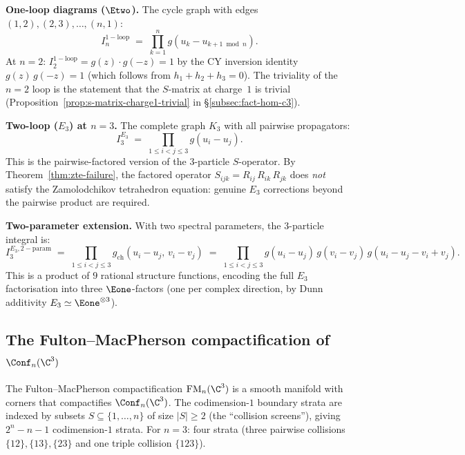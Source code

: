 \medskip\noindent\textbf{One-loop diagrams ($\Etwo$).} The cycle graph with edges $(1,2), (2,3), \ldots, (n,1)$:
\begin{equation}\label{eq:loop-integral}
 I_n^{\mathrm{1-loop}} \;=\; \prod_{k=1}^{n} g(u_k - u_{k+1 \bmod n}).
\end{equation}
At $n = 2$: $I_2^{\mathrm{1-loop}} = g(z) \cdot g(-z) = 1$ by the CY inversion identity $g(z)\, g(-z) = 1$ (which follows from $h_1 + h_2 + h_3 = 0$). The triviality of the $n = 2$ loop is the statement that the $S$-matrix at charge~$1$ is trivial (Proposition~\ref{prop:s-matrix-charge1-trivial} in \S\ref{subsec:fact-hom-c3}).

\medskip\noindent\textbf{Two-loop ($E_3$) at $n = 3$.} The complete graph $K_3$ with all pairwise propagators:
\begin{equation}\label{eq:two-loop-integral}
 I_3^{E_3} \;=\; \prod_{1 \leq i < j \leq 3} g(u_i - u_j).
\end{equation}
This is the pairwise-factored version of the $3$-particle $S$-operator. By Theorem~\ref{thm:zte-failure}, the factored operator $S_{ijk} = R_{ij}\, R_{ik}\, R_{jk}$ does \emph{not} satisfy the Zamolodchikov tetrahedron equation: genuine $E_3$ corrections beyond the pairwise product are required.

\medskip\noindent\textbf{Two-parameter extension.}
With two spectral parameters, the $3$-particle integral is:
\begin{equation}\label{eq:two-loop-two-param}
 I_3^{E_3, \mathrm{2-param}} \;=\; \prod_{1 \leq i < j \leq 3} g_{\mathrm{ch}}(u_i - u_j,\, v_i - v_j)
 \;=\; \prod_{1 \leq i < j \leq 3} g(u_i - u_j)\, g(v_i - v_j)\, g(u_i - u_j - v_i + v_j).
\end{equation}
This is a product of $9$ rational structure functions, encoding the full $E_3$ factorisation into three $\Eone$-factors (one per complex direction, by Dunn additivity $E_3 \simeq \Eone^{\otimes 3}$).


\subsection{The Fulton--MacPherson compactification of \texorpdfstring{$\Conf_n(\C^3)$}{Conf-n(C-3)}}
\label{subsec:fm-c3}

The Fulton--MacPherson compactification $\mathrm{FM}_n(\C^3)$ is a smooth manifold with corners that compactifies $\Conf_n(\C^3)$. The codimension-$1$ boundary strata are indexed by subsets $S \subseteq \{1, \ldots, n\}$ of size $|S| \geq 2$ (the ``collision screens''), giving $2^n - n - 1$ codimension-$1$ strata. For $n = 3$: four strata (three pairwise collisions $\{12\}, \{13\}, \{23\}$ and one triple collision $\{123\}$).

